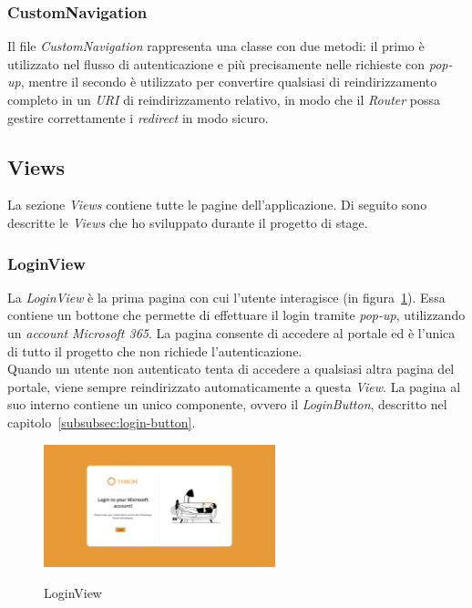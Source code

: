 \subsubsection{CustomNavigation}\label{subsubsec:custom-navigation}
Il file \textit{CustomNavigation} rappresenta una classe con due metodi: il primo è utilizzato nel flusso di autenticazione e più precisamente nelle richieste con \textit{pop-up},
mentre il secondo è utilizzato per convertire qualsiasi  di reindirizzamento completo in un \textit{URI} di reindirizzamento relativo, in modo che il \textit{Router}
possa gestire correttamente i \textit{redirect} in modo sicuro.

\subsection{Views}\label{subsec:views}
La sezione \textit{Views} contiene tutte le pagine dell'applicazione.
Di seguito sono descritte le \textit{Views} che ho sviluppato durante il progetto di stage.

\subsubsection{LoginView}\label{subsubsec:login-view}
La \textit{LoginView} è la prima pagina con cui l'utente interagisce (in figura~\ref{fig:login-view}). Essa contiene un bottone che permette di effettuare il login tramite \textit{pop-up}, utilizzando un \textit{account Microsoft 365}.
La pagina consente di accedere al portale ed è l'unica di tutto il progetto che non richiede l'autenticazione.\\
Quando un utente non autenticato tenta di accedere a qualsiasi altra pagina del portale, viene sempre reindirizzato
automaticamente a questa \textit{View}. La pagina al suo interno contiene un unico componente, ovvero il \textit{LoginButton}, descritto nel capitolo~\ref{subsubsec:login-button}.
\begin{figure}[ht]
  \centering
  \includegraphics[width=0.6\textwidth, alt={Pagina di login dell'applicazione}]{images/frontend/LoginView.jpg}
  \caption{LoginView}\label{fig:login-view}
\end{figure}

